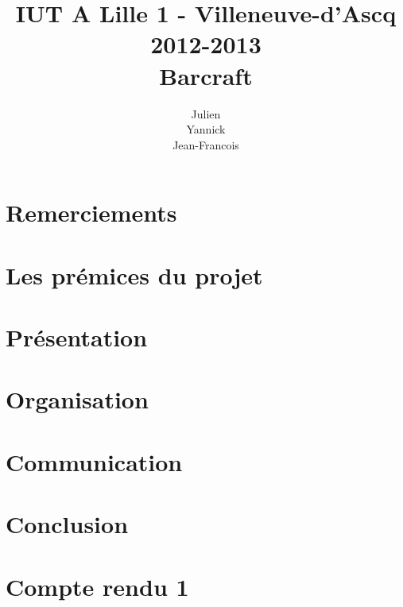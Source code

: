 \documentclass[11pt,a4paper]{report}
\title
{
	\normalsize{IUT A Lille 1 - Villeneuve-d'Ascq\\
	2012-2013}\\
	\vspace{15mm}
  \Huge{Barcraft
    \vspace{15mm}}
}
\author{
\bsc{Stechele} Julien\\
\bsc{Vanuxem} Yannick\\
\bsc{Serir} Jean-Francois\\
	\vspace{30mm}
}
\begin{document}

\maketitle
\tableofcontents
\newpage

\chapter{Remerciements}%
\label{cha:remerciements}



\chapter{Les prémices du projet}%
\label{cha:les_pr_mices_du_projet}



\chapter{Présentation}%
\label{cha:presentation}



\chapter{Organisation}%
\label{cha:organisation}



\chapter{Communication}%
\label{cha:communication}



\chapter{Conclusion}%
\label{cha:conclusion}




\appendix

\chapter{Compte rendu 1}%
\label{cha:compte_rendu_1}
\end{document}

